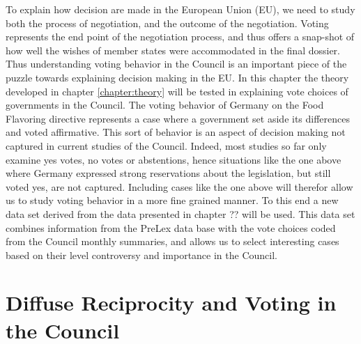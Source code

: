 To explain how decision are made in the European Union (EU), we need to study both the process of negotiation, and the outcome of the negotiation. Voting represents the end point of the negotiation process, and thus offers a snap-shot of how well the wishes of member states were accommodated in the final dossier. Thus understanding voting behavior in the Council is an important piece of the puzzle towards explaining decision making in the EU. In this chapter the theory developed in chapter \ref{chapter:theory} will be tested in explaining vote choices of governments in the Council. The voting behavior of Germany on the Food Flavoring directive represents a case where a government set aside its differences and voted affirmative. This sort of behavior is an aspect of decision making not captured in current studies of the Council. Indeed, most studies so far only examine yes votes, no votes or abstentions, hence situations like the one above where Germany expressed strong reservations about the legislation, but still voted yes, are not captured. Including cases like the one above will therefor allow us to study voting behavior in a more fine grained manner. To this end a new data set derived from the data presented in chapter ?? will be used. This data set combines information from the PreLex data base with the vote choices coded from the Council monthly summaries, and allows us to select interesting cases based on their level controversy and importance in the Council. 


\section{Diffuse Reciprocity and Voting in the Council}

